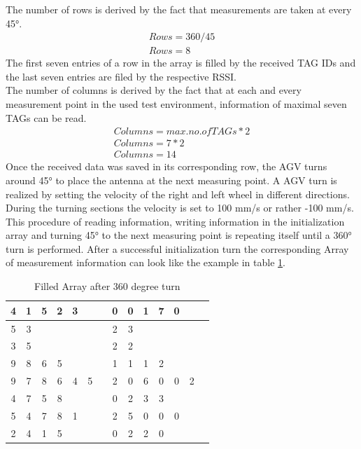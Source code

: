 The number of rows is derived by the fact that measurements are taken at every 45°. \\
\begin{align}
Rows = 360/45\\
Rows = 8
\end{align}
The first seven entries of a row in the array is filled by the received TAG IDs and the last seven entries are filed by the respective RSSI. \\
The number of columns is derived by the fact that at each and every measurement point in the used test environment, information of maximal seven TAGs can be read. \\
\begin{align}
Columns = max. no. of  TAGs * 2\\
Columns = 7 * 2\\
Columns = 14
\end{align}
Once the received data was saved in its corresponding row, the AGV turns around 45° to place the antenna at the next measuring point. A AGV turn is realized by setting the velocity of the right and left wheel in different directions. During the turning sections the velocity is set to 100 mm/s or rather -100 mm/s. 
This procedure of reading information, writing information in the initialization array and turning 45° to the next measuring point is repeating itself until a 360° turn is performed. After a successful initialization turn the corresponding Array of measurement information can look like the example in table \ref{Init_Array}.
\begin{table}[!htbp]
\centering
\begin{tabular}{|c|c|c|c|c|c|c|c|c|c|c|c|c|c|}
\hline
4&1&5&2&3&&&0&0&1&7&0&&  \\ \hline
5&3&&&&&&2&3&&&&&  \\ \hline
3&5&&&&&&2&2&&&&&  \\ \hline
9&8&6&5&&&&1&1&1&2&&&  \\ \hline
9&7&8&6&4&5&&2&0&6&0&0&2&  \\ \hline
4&7&5&8&&&&0&2&3&3&&&  \\ \hline
5&4&7&8&1&&&2&5&0&0&0&&  \\ \hline
2&4&1&5&&&&0&2&2&0&&&  \\ \hline
\end{tabular}
\caption{Filled Array after 360 degree turn}
\label{Init_Array}
\end{table}\\
